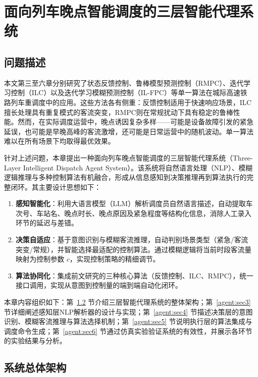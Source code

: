 \chapter{面向列车晚点智能调度的三层智能代理系统}\label{chap:agent}

\setcounter{algorithm}{0} %

\section{问题描述}
\label{agent:sec1}

本文第三至六章分别研究了状态反馈控制、鲁棒模型预测控制（RMPC）、迭代学习控制（ILC）以及迭代学习模糊预测控制（IL-FPC）等单一算法在城际高速铁路列车重调度中的应用。这些方法各有侧重：反馈控制适用于快速响应场景，ILC擅长处理具有重复模式的客流突变，RMPC则在常规扰动下具有稳定的鲁棒性能。然而，在实际调度运营中，晚点诱因复杂多样——可能是设备故障引发的紧急延误，也可能是早晚高峰的客流激增，还可能是日常运营中的随机波动。单一算法难以在所有场景下均取得最优效果。

针对上述问题，本章提出一种面向列车晚点智能调度的三层智能代理系统（Three-Layer Intelligent Dispatch Agent System）。该系统将自然语言处理（NLP）、模糊逻辑推理与多种控制算法有机融合，形成从信息感知到决策推理再到算法执行的完整闭环。其主要设计思想如下：

\begin{enumerate}
    \item \textbf{感知智能化}：利用大语言模型（LLM）解析调度员自然语言描述，自动提取车次号、车站名、晚点时长、晚点原因及紧急程度等结构化信息，消除人工录入环节的延迟与差错。
    \item \textbf{决策自适应}：基于意图识别与模糊客流推理，自动判别场景类型（紧急/客流突变/常规），并智能选择最适配的控制算法。通过模糊逻辑将当前时段客流量映射为控制参数 $c$，实现控制策略的精细调节。
    \item \textbf{算法协同化}：集成前文研究的三种核心算法（反馈控制、ILC、RMPC），统一接口调用，实现从意图到控制量的端到端自动化闭环。
\end{enumerate}

本章内容组织如下：第~\ref{agent:sec2} 节介绍三层智能代理系统的整体架构；第~\ref{agent:sec3} 节详细阐述感知层NLP解析器的设计与实现；第~\ref{agent:sec4} 节描述决策层的意图识别、模糊客流推理与算法选择机制；第~\ref{agent:sec5} 节说明执行层的算法集成与调度命令生成；第~\ref{agent:sec6} 节通过仿真实验验证系统的有效性，并展示各环节的实验结果与分析。

\section{系统总体架构}
\label{agent:sec2}

